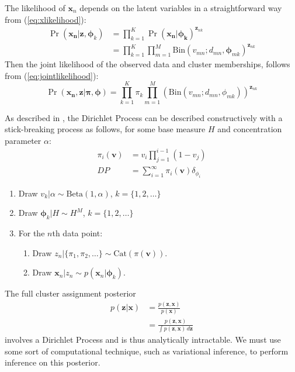 \documentclass[11pt]{article}
\newcommand{\bx}{\ensuremath{\mathbf{x}}}
\newcommand{\bz}{\ensuremath{\mathbf{z}}}
\newcommand{\bphi}{\ensuremath{\bm{\phi}}}
\begin{document}
The likelihood of $\bx_n$ depends on the latent variables in a straightforward way from (\ref{eq:xlikelihood}):
\begin{align} \label{eq:jointlikelihood}
\Pr(\mathbf{x_n} | \bz, \bphi_k) &= \prod\limits_{k=1}^K \Pr(\mathbf{x_n} | \mathbf{\phi_k})^{\bz_{nk}} \nonumber \\
										&= \prod\limits_{k=1}^K \prod\limits_{m=1}^M \mathrm{Bin}(v_{mn}; d_{mn}, \bphi_{mk})^{\bz_{nk}}
\end{align}
Then the joint likelihood of the observed data and cluster memberships, follows from (\ref{eq:jointlikelihood}): 
\begin{equation}
\Pr(\mathbf{x_n}, \bz | \bm{\pi}, \bphi) = \prod\limits_{k=1}^K \pi_k  \prod\limits_{m=1}^M \left(\mathrm{Bin}(v_{mn}; d_{mn}, \phi_{mk})\right)^{\bz_{nk}}
\end{equation}

As described in \cite{Blei2006}, the Dirichlet Process can be described constructively with a stick-breaking process as follows, for some base measure $H$ and concentration parameter $\alpha$:
\begin{align}
\pi_i(\mathbf{v}) &= v_i \prod\limits_{j=1}^{i-1} (1 - v_j) \\
				DP &= \sum_{i=1}^\infty \pi_i(\mathbf{v}) \delta_{\phi_i}
\end{align}
\begin{enumerate}
	\item Draw $v_k | \alpha \sim \mathrm{Beta}(1, \alpha)$, \hspace{0.2cm} $k = \{1, 2, \ldots\}$
	\item Draw $\bphi_k | H \sim H^M$, \hspace{1cm} $k = \{1, 2, \ldots\}$
	\item For the $n$th data point:
	\begin{enumerate}
		\item Draw $z_n | \{\pi_1, \pi_2, \ldots\} \sim \mathrm{Cat}(\pi(\mathbf{v}))$.
		\item Draw $\bx_n | z_n \sim p(\bx_n | \bphi_k)$.
	\end{enumerate}
\end{enumerate}
The full cluster assignment posterior 
\begin{align}
p(\bz | \bx) &= \frac{p(\bz, \bx)}{p(\bx)} \nonumber \\
     					     &=\frac{p(\bz, \bx)}{\int p(\bz, \bx) \,d\bz}
\end{align}
involves a Dirichlet Process and is thus analytically intractable. We must use some sort of computational technique, such as variational inference, to perform inference on this posterior.
\end{document}
